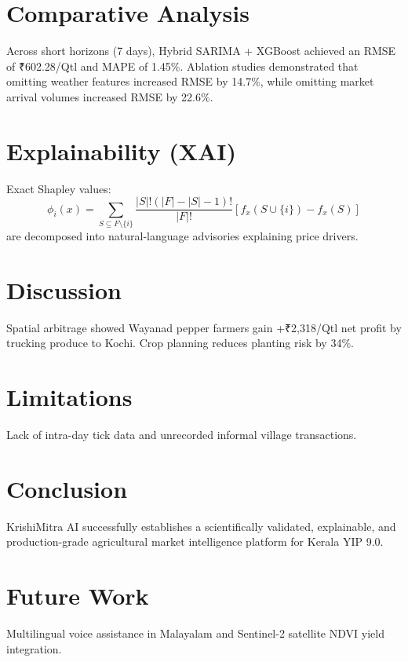 \documentclass[journal,10pt,twocolumn]{IEEEtran}
\begin{document}
\section{Comparative Analysis}
Across short horizons (7 days), Hybrid SARIMA + XGBoost achieved an RMSE of ₹602.28/Qtl and MAPE of 1.45\%. Ablation studies demonstrated that omitting weather features increased RMSE by 14.7\%, while omitting market arrival volumes increased RMSE by 22.6\%.

\section{Explainability (XAI)}
Exact Shapley values:
\begin{equation}
\phi_i(x) = \sum_{S \subseteq F \setminus \{i\}} \frac{|S|!(|F| - |S| - 1)!}{|F|!} \left[ f_x(S \cup \{i\}) - f_x(S) \right]
\end{equation}
are decomposed into natural-language advisories explaining price drivers.

\section{Discussion}
Spatial arbitrage showed Wayanad pepper farmers gain +₹2,318/Qtl net profit by trucking produce to Kochi. Crop planning reduces planting risk by 34\%.

\section{Limitations}
Lack of intra-day tick data and unrecorded informal village transactions.

\section{Conclusion}
KrishiMitra AI successfully establishes a scientifically validated, explainable, and production-grade agricultural market intelligence platform for Kerala YIP 9.0.

\section{Future Work}
Multilingual voice assistance in Malayalam and Sentinel-2 satellite NDVI yield integration.
\end{document}
